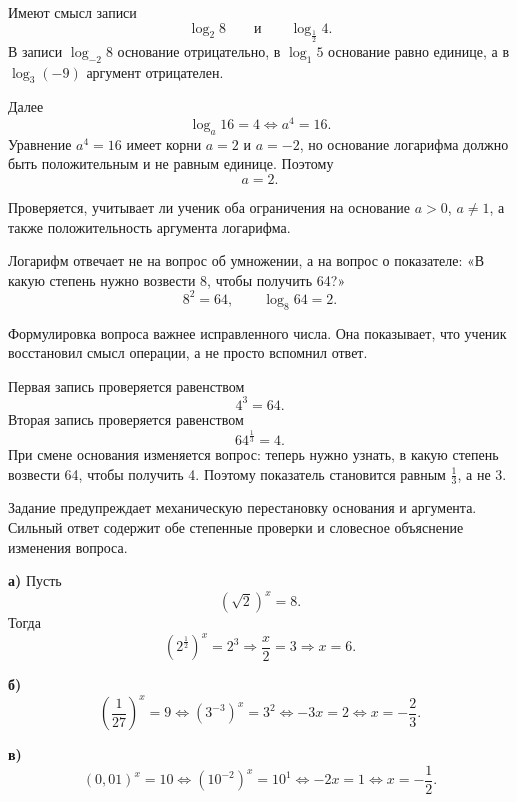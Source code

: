 \begin{teacheranswer}[Задание 7]
  Имеют смысл записи
  \[
    \log_2 8\qquad\text{и}\qquad \log_{\frac12}4.
  \]
  В записи \(\log_{-2}8\) основание отрицательно, в \(\log_1 5\)
  основание равно единице, а в \(\log_3(-9)\) аргумент отрицателен.

  Далее
  \[
    \log_a16=4
    \Longleftrightarrow
    a^4=16.
  \]
  Уравнение \(a^4=16\) имеет корни \(a=2\) и \(a=-2\), но основание
  логарифма должно быть положительным и не равным единице. Поэтому
  \[
    \boxed{a=2}.
  \]
\end{teacheranswer}

\begin{criterionbox}
  Проверяется, учитывает ли ученик оба ограничения на основание
  \(a>0\), \(a\ne1\), а также положительность аргумента логарифма.
\end{criterionbox}

\begin{teacheranswer}[Задание 8]
  Логарифм отвечает не на вопрос об умножении, а на вопрос о показателе:
  «В какую степень нужно возвести 8, чтобы получить 64?»
  \[
    8^2=64,
    \qquad
    \boxed{\log_8 64=2}.
  \]
\end{teacheranswer}

\begin{criterionbox}
  Формулировка вопроса важнее исправленного числа. Она показывает, что
  ученик восстановил смысл операции, а не просто вспомнил ответ.
\end{criterionbox}

\begin{teacheranswer}[Задание 9]
  Первая запись проверяется равенством
  \[
    4^3=64.
  \]
  Вторая запись проверяется равенством
  \[
    64^{\frac13}=4.
  \]
  При смене основания изменяется вопрос: теперь нужно узнать, в какую
  степень возвести 64, чтобы получить 4. Поэтому показатель становится
  равным \(\frac13\), а не 3.
\end{teacheranswer}

\begin{criterionbox}
  Задание предупреждает механическую перестановку основания и аргумента.
  Сильный ответ содержит обе степенные проверки и словесное объяснение
  изменения вопроса.
\end{criterionbox}

\begin{teacheranswer}[Задание 10*]
  \textbf{а)} Пусть
  \[
    (\sqrt2)^x=8.
  \]
  Тогда
  \[
    \left(2^{\frac12}\right)^x=2^3
    \Longrightarrow
    \frac{x}{2}=3
    \Longrightarrow
    \boxed{x=6}.
  \]

  \textbf{б)}
  \[
    \left(\frac1{27}\right)^x=9
    \Longleftrightarrow
    (3^{-3})^x=3^2
    \Longleftrightarrow
    -3x=2
    \Longleftrightarrow
    \boxed{x=-\frac23}.
  \]

  \textbf{в)}
  \[
    (0{,}01)^x=10
    \Longleftrightarrow
    (10^{-2})^x=10^1
    \Longleftrightarrow
    -2x=1
    \Longleftrightarrow
    \boxed{x=-\frac12}.
  \]
\end{teacheranswer}

